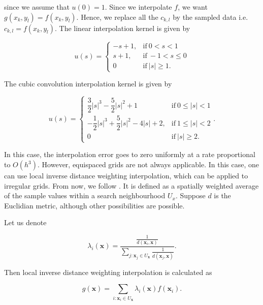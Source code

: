 \documentclass[12pt,a4paper,oneside]{book}
\begin{document}
{since we assume that $u(0) = 1$. Since we interpolate $f$, we want $g(x_k,y_l) = f(x_k,y_l)$. Hence, we replace all the $c_{k,l}$ by the sampled data i.e. $c_{k,l} = f(x_k,y_l)$. The linear interpolation kernel is given by 

 \begin{equation}
    u(s)=
    \begin{cases}
      -s+1, & \text{if}\ 0 < s < 1 \\
      s+1, & \text{if}\ -1 < s \leq 0 \\
      0 & \text{if}\ |s| \geq 1 .
    \end{cases}
 \end{equation}
 
The cubic convolution interpolation kernel is given by 

\begin{equation}
    u(s)=
    \begin{cases}
      \dfrac{3}{2}|s|^3 - \dfrac{5}{2}|s|^2 +1 & \text{if}\ 0 \leq |s| < 1 \\
      -\dfrac{1}{2} |s|^3 + \dfrac{5}{2}|s|^2 - 4|s| +2, & \text{if}\ 1 \leq |s| < 2 \\
      0 & \text{if}\ |s| \geq 2 .
    \end{cases}.
\end{equation}

In this case, the interpolation error goes to zero
uniformly at a rate proportional to $O(h^3)$. However, equispaced grids are not always applicable. In this case, one can use local inverse distance weighting interpolation, which can be applied to irregular grids. From now, we follow \cite{babak2009statistical}.  It is defined as a spatially weighted average of the sample values within a search neighbourhood $U_x$. Suppose $d$ is the Euclidian metric, although other possibilities are possible.

Let us denote 

\begin{equation}
\lambda_i(\bm{x}) = \dfrac{\frac{1}{d(\bm{x}_i,\bm{x})}}{\sum\limits_{j : \bm{x}_j \in U_{\bm{x}}} \frac{1}{d(\bm{x}_j,\bm{x})}}.
\end{equation}

Then local inverse distance weighting interpolation is calculated as 

\begin{equation}
g(\bm{x}) = \sum\limits_{i : \bm{x}_i \in U_{\bm{x}}}  \lambda_i(\bm{x}) f(\bm{x}_i).
\end{equation}


}
\end{document}
